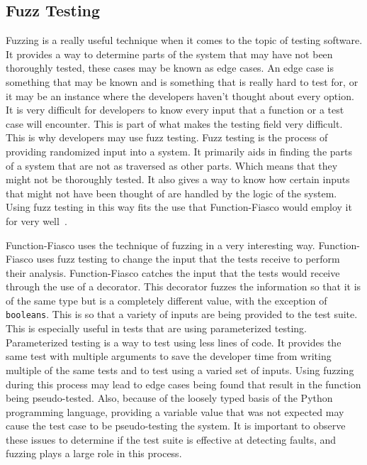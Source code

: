   \subsection{Fuzz Testing}
  Fuzzing is a really useful technique when it comes to the topic of testing software. It provides a way to determine parts of the system that may have not been thoroughly tested, these cases may be known as edge cases. An edge case is something that may be known and is something that is really hard to test for, or it may be an instance where the developers haven't thought about every option. It is very difficult for developers to know every input that a function or a test case will encounter. This is part of what makes the testing field very difficult. This is why developers may use fuzz testing. Fuzz testing is the process of providing randomized input into  a system. It primarily aids in finding the parts of a system that are not as traversed as other parts. Which means that they might not be thoroughly tested. It also gives a way to know how certain inputs that might not have been thought of are handled by the logic of the system. Using fuzz testing in this way fits the use that Function-Fiasco would employ it for very well~\cite{niedermayr2016will}.

  Function-Fiasco uses the technique of fuzzing in a very interesting way. Function-Fiasco uses fuzz testing to change the input that the tests receive to perform their analysis. Function-Fiasco catches the input that the tests would receive through the use of a decorator. This decorator fuzzes the information so that it is of the same type but is a completely different value, with the exception of \texttt{booleans}. This is so that a variety of inputs are being provided to the test suite. This is especially useful in tests that are using parameterized testing. Parameterized testing is a way to test using less lines of code. It provides the same test with multiple arguments to save the developer time from writing multiple of the same tests and to test using a varied set of inputs. Using fuzzing during this process may lead to edge cases being found that result in the function being pseudo-tested. Also, because of the loosely typed basis of the Python programming language, providing a variable value that was not expected may cause the test case to be pseudo-testing the system. It is important to observe these issues to determine if the test suite is effective at detecting faults, and fuzzing plays a large role in this process.

